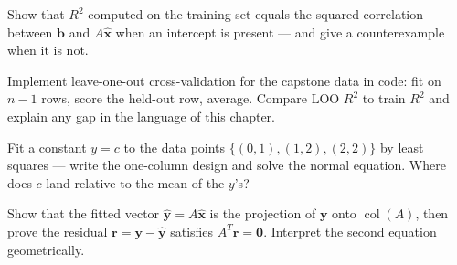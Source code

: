 \begin{exercise}[hard]
Show that $R^{2}$ computed on the training set equals the squared
correlation between $\mathbf b$ and $A\hat{\mathbf x}$ when an intercept
is present --- and give a counterexample when it is not.
\end{exercise}

\begin{exercise}[hard]
Implement leave-one-out cross-validation for the capstone data in code:
fit on $n-1$ rows, score the held-out row, average. Compare LOO $R^{2}$
to train $R^{2}$ and explain any gap in the language of this chapter.
\end{exercise}
\begin{exercise}[easy]
Fit a constant $y=c$ to the data points $\{(0,1),(1,2),(2,2)\}$ by
least squares --- write the one-column design and solve the normal
equation. Where does $c$ land relative to the mean of the $y$'s?
\end{exercise}
\begin{exercise}[hard]
Show that the fitted vector $\hat{\mathbf y}=A\hat{\mathbf x}$ is the
projection of $\mathbf y$ onto $\operatorname{col}(A)$, then prove the
residual $\mathbf r=\mathbf y-\hat{\mathbf y}$ satisfies
$A^{T}\mathbf r=\mathbf 0$. Interpret the second equation
geometrically.
\end{exercise}

